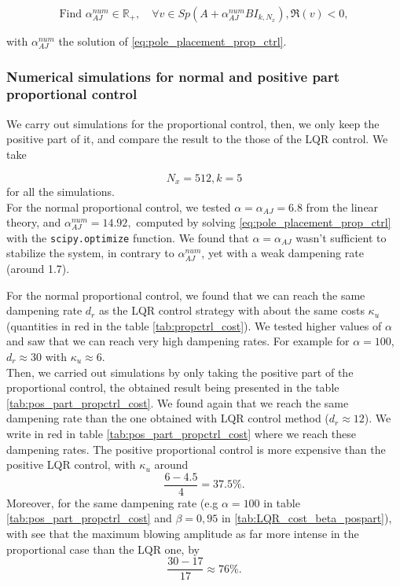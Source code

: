 \documentclass[12pt]{article}
\begin{document}
\begin{equation}\label{eq:pole_placement_prop_ctrl}
\boxed{
    \text{Find }\alpha^{num}_{AJ} \in \mathbb{R}_+,  \quad \forall v \in Sp(A+\alpha^{num}_{AJ} BI_{k, N_x}), \mathfrak{R}(v) <0,
    }
\end{equation}

with $\alpha_{AJ}^{num}$ the solution of \eqref{eq:pole_placement_prop_ctrl}.


\subsubsection{Numerical simulations for normal and positive part proportional control}
We carry out simulations for the proportional control, then, we only keep the positive part of it, and
compare the result to the those of the LQR control. We take 

\begin{equation}
\boxed{
    N_x = 512, k=5}
\end{equation}
for all the simulations.
\\


For the normal proportional control, we tested $\alpha = \alpha_{AJ}= 6.8$ from the linear theory, 
and $\alpha^{num}_{AJ} = 14.92,$ computed by solving \eqref{eq:pole_placement_prop_ctrl} with the
 \texttt{scipy.optimize} function. We found that $\alpha = \alpha_{AJ}$ wasn't sufficient 
to stabilize the system, in contrary to $\alpha_{AJ}^{num}$, yet with a weak dampening rate (around 1.7).

For the normal proportional control, we found that we can reach the same dampening rate $d_r$ as the LQR control
strategy with about the same costs $\kappa_u$ (quantities in red in the table \ref{tab:propctrl_cost}). We tested higher values
of $\alpha$ and saw that we can reach very high dampening rates. For example for $\alpha = 100$, $d_r \approx 30$ 
with $\kappa_u \approx 6$.
\\

Then, we carried out simulations by only taking the positive part of the proportional control, the obtained result
being presented in the table \ref{tab:pos_part_propctrl_cost}. We found again that we reach the same dampening rate than
the one obtained with LQR control method ($d_r \approx 12$). We write in red in table \ref{tab:pos_part_propctrl_cost} where
we reach these dampening rates. The positive proportional control is more expensive than the 
positive LQR control, with $\kappa_u$ around $$\frac{6-4.5}{4}= 37.5 \%.$$ Moreover, for the same dampening rate (e.g $\alpha =100$ in table \ref{tab:pos_part_propctrl_cost} and $\beta = 0,95$ in \ref{tab:LQR_cost_beta_pospart}), with see that the maximum blowing amplitude as far more intense in the proportional case than the LQR one, by $$\frac{30-17}{17}\approx 76 \%.$$
\end{document}
